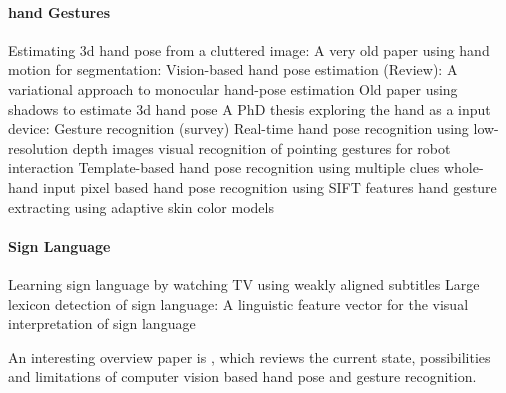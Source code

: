 \paragraph{hand Gestures}
Estimating 3d hand pose from a cluttered image: \cite{Athitsos2003}
A very old paper using hand motion for segmentation: \cite{Cui1996}
Vision-based hand pose estimation (Review): \cite{Erol2007}
A variational approach to monocular hand-pose estimation \cite{laGorce2010}
Old paper using shadows to estimate 3d hand pose \cite{Segen1999}
A PhD thesis exploring the hand as a input device: \cite{Sturman1992}
Gesture recognition (survey) \cite{Mitra2007}
Real-time hand pose recognition using low-resolution depth images \cite{Mo2006}
visual recognition of pointing gestures for robot interaction \cite{Nickel2007}
Template-based hand pose recognition using multiple clues \cite{Stenger2006}
whole-hand input \cite{Sturman1992}
pixel based hand pose recognition using SIFT features \cite{Wang2007}
hand gesture extracting using adaptive skin color models \cite{Xiong2006}

\paragraph{Sign Language}
Learning sign language by watching TV using weakly aligned subtitles \cite{Buehler2009}
Large lexicon detection of sign language: \cite{Cooper2007}
A linguistic feature vector for the visual interpretation of sign language \cite{RichardBowden2004}




An interesting overview paper is \cite{Erol2007}, which reviews the current state, possibilities and limitations of computer vision based hand pose and gesture recognition.



